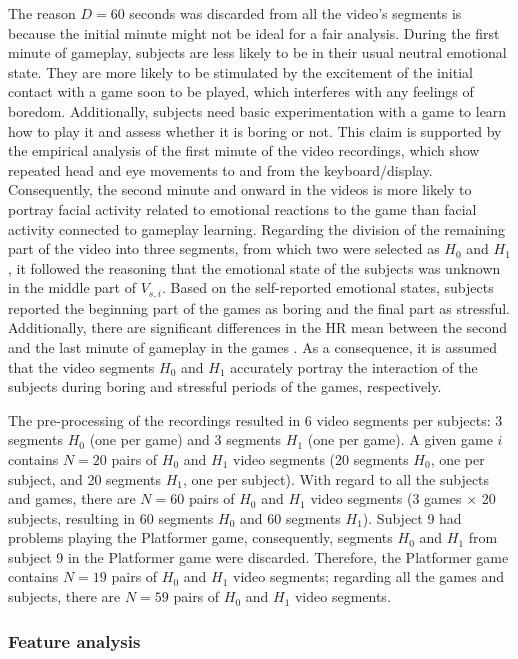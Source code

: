 The reason $D=60$ seconds was discarded from all the video's segments is because the initial minute might not be ideal for a fair analysis. During the first minute of gameplay, subjects are less likely to be in their usual neutral emotional state. They are more likely to be stimulated by the excitement of the initial contact with a game soon to be played, which interferes with any feelings of boredom. Additionally, subjects need basic experimentation with a game to learn how to play it and assess whether it is boring or not. This claim is supported by the empirical analysis of the first minute of the video recordings, which show repeated head and eye movements to and from the keyboard/display. Consequently, the second minute and onward in the videos is more likely to portray facial activity related to emotional reactions to the game than facial activity connected to gameplay learning. Regarding the division of the remaining part of the video into three segments, from which two were selected as $H_0$ and $H_1$, it followed the reasoning that the emotional state of the subjects was unknown in the middle part of $V_{s,i}$. Based on the self-reported emotional states, subjects reported the beginning part of the games as boring and the final part as stressful. Additionally, there are significant differences in the HR mean between the second and the last minute of gameplay in the games \parencite{bevilacqua2018changes}. As a consequence, it is assumed that the video segments $H_0$ and $H_1$ accurately portray the interaction of the subjects during boring and stressful periods of the games, respectively.

The pre-processing of the recordings resulted in 6 video segments per subjects: 3 segments $H_0$ (one per game) and 3 segments $H_1$ (one per game). A given game $i$ contains $N=20$ pairs of $H_0$ and $H_1$ video segments (20 segments $H_0$, one per subject, and 20 segments $H_1$, one per subject). With regard to all the subjects and games, there are $N=60$ pairs of $H_0$ and $H_1$ video segments (3 games $\times$ 20 subjects, resulting in 60 segments $H_0$ and 60 segments $H_1$). Subject 9 had problems playing the Platformer game, consequently, segments $H_0$ and $H_1$ from subject 9 in the Platformer game were discarded. Therefore, the Platformer game contains $N=19$ pairs of $H_0$ and $H_1$ video segments; regarding all the games and subjects, there are $N=59$ pairs of $H_0$ and $H_1$ video segments.

\subsubsection{Feature analysis}


